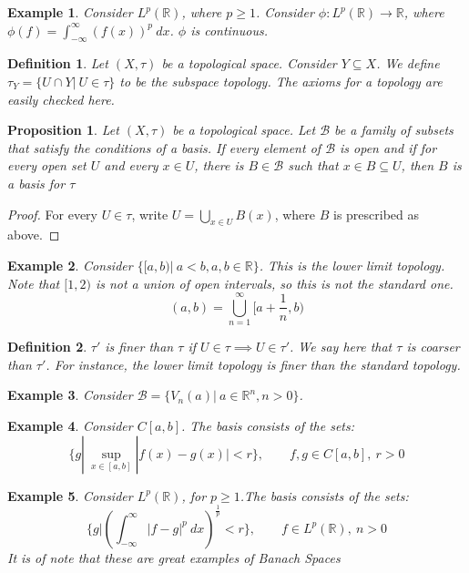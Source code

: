 \documentclass{article}
\newcommand{\R}{\mathbb{R}}
\newtheorem{example}{Example}
\newtheorem{proposition}{Proposition}
\newtheorem{definition}{Definition}
\begin{document}
\begin{example}
Consider $L^p(\R)$, where $p\geq 1$. Consider $\phi:L^p(\R)\rightarrow \R$, where $\phi(f)=\int_{-\infty}^\infty (f(x))^p\ dx$. $\phi$ is continuous.
\end{example}
\begin{definition}
Let $(X,\tau)$ be a topological space. Consider $Y\subseteq X$. We define $\tau_Y = \{U\cap Y|\ U\in \tau\}$ to be the subspace topology. The axioms for a topology are easily checked here.
\end{definition}
\begin{proposition}
Let $(X,\tau)$ be a topological space. Let $\mathcal{B}$ be a family of subsets that satisfy the conditions of a basis. 
If every element of $\mathcal{B}$ is open and if for every open set $U$ and every $x\in U$, there is $B\in\mathcal{B}$ such that $x\in B\subseteq U$, then $B$ is a basis for $\tau$ 
\end{proposition}
\begin{proof}
For every $U\in \tau$, write $U=\displaystyle\bigcup_{x\in U} B(x)$, where $B$ is prescribed as above. 
\end{proof}
\begin{example}
Consider $\{[a,b)|\ a<b, a,b\in\R\}$. This is the lower limit topology. Note that $[1,2)$ is not a union of open intervals, so this is not the standard one. 
$$(a,b)=\displaystyle\bigcup_{n=1}^\infty [a+\frac{1}{n},b)$$
\end{example}
\begin{definition}
$\tau'$ is finer than $\tau$ if $U\in \tau\implies U\in \tau'$. We say here that $\tau$ is coarser than $\tau'$. For instance, 
the lower limit topology is finer than the standard topology.
\end{definition}
\begin{example}
Consider $\mathcal{B}=\{V_n(a)|\ a\in\R^n, n>0\}$.
\end{example}
\begin{example}
Consider $C[a,b]$. The basis consists of the sets:
$$\{g|\ \sup_{x\in[a,b]} |f(x)-g(x)|<r\},\qquad f,g\in C[a,b],\ r>0$$
\end{example}
\begin{example}
Consider $L^p(\R)$, for $p\geq 1$.The basis consists of the sets:
$$\{g|\left(\int_{-\infty}^\infty |f-g|^p\ dx\right)^\frac{1}{p}<r\},\qquad f\in L^p(\R),\ n>0$$
It is of note that these are great examples of Banach Spaces
\end{example}
\end{document}
